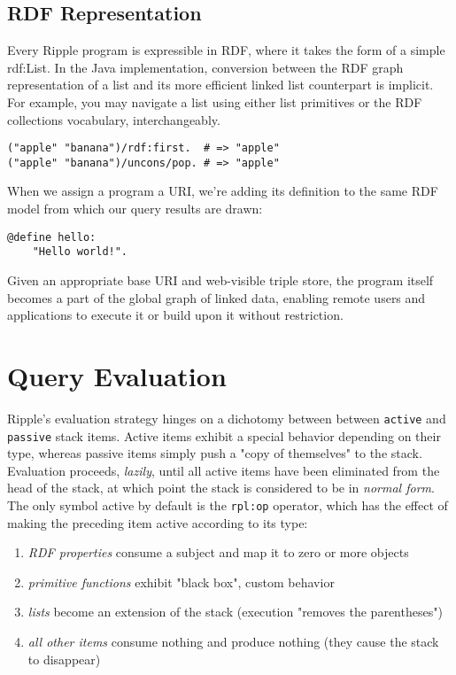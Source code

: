 \documentclass[runningheads]{llncs}
\begin{document}
\subsection{RDF Representation}
Every Ripple program is expressible in RDF, where it takes the form of a simple rdf:List.  In the Java implementation, conversion between the RDF graph representation of a list and its more efficient linked list counterpart is implicit.  For example, you may navigate a list using either list primitives or the RDF collections vocabulary, interchangeably.
\begin{verbatim}
("apple" "banana")/rdf:first.  # => "apple"
("apple" "banana")/uncons/pop. # => "apple"
\end{verbatim}

When we assign a program a URI, we're adding its definition to the same RDF model from which our query results are drawn:
\begin{verbatim}
@define hello:
    "Hello world!".
\end{verbatim}

Given an appropriate base URI and web-visible triple store, the program itself becomes a part of the global graph of linked data, enabling remote users and applications to execute it or build upon it without restriction.


\section{Query Evaluation}

Ripple's evaluation strategy hinges on a dichotomy between between \texttt{active} and \texttt{passive} stack items.  Active items exhibit a special behavior depending on their type, whereas passive items simply push a "copy of themselves" to the stack.  Evaluation proceeds, \textit{lazily}, until all active items have been eliminated from the head of the stack, at which point the stack is considered to be in \textit{normal form}.  The only symbol active by default is the \texttt{rpl:op} operator, which has the effect of making the preceding item active according to its type:
\begin{enumerate}
\item \textit{RDF properties} consume a subject and map it to zero or more objects
\item \textit{primitive functions} exhibit "black box", custom behavior
\item \textit{lists} become an extension of the stack (execution "removes the parentheses")
\item \textit{all other items} consume nothing and produce nothing (they cause the stack to disappear)
\end{enumerate}
\end{document}

